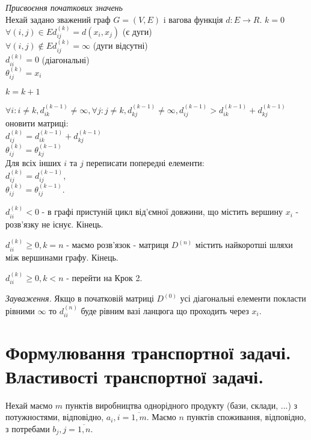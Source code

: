 \documentclass[12pt,a4paper]{report}
\newenvironment{slim_enumerate}{
\begin{enumerate}
  \setlength{\itemsep}{1pt}
  \setlength{\parskip}{0pt}
  \setlength{\parsep}{0pt}}
{\end{enumerate}}
\begin{document}
\begin{slim_enumerate}
  \item \emph{Присвоєння початкових значень}\\
Нехай задано зважений граф $G=(V,E)$ i вагова функція $d:E \rightarrow R$.
$k=0$\\
$\forall (i,j) \in E d_{ij}^{(k)}=d(x_i,x_j)$ (є дуги)\\
$\forall (i,j) \notin E d_{ij}^{(k)}=\infty$ (дуги відсутні)\\
$d_{ii}^{(k)}=0$ (діагональні)\\
$\theta_{ij}^{(k)}=x_i$
  \item $k=k+1$
  \item $\forall i: i \neq k, d_{ik}^{(k-1)} \neq \infty, \forall j: j \neq k, d_{kj}^{(k-1)} \neq \infty, d_{ij}^{(k-1)}>d_{ik}^{(k-1)}+d_{kj}^{(k-1)}$ оновити матриці:\\
$d_{ij}^{(k)}=d_{ik}^{(k-1)}+d_{kj}^{(k-1)}$\\
$\theta_{ij}^{(k)}=\theta_{kj}^{(k-1)}$\\
Для всіх інших $i$ та $j$ переписати попередні елементи:\\
$d_{ij}^{(k)}=d_{ij}^{(k-1)}$,\\
$\theta_{ij}^{(k)}=\theta_{ij}^{(k-1)}$.
  \item 
    \begin{slim_enumerate}
      \item $d_{ii}^{(k)} < 0$ - в графі пристуній цикл від’ємної довжини, що містить вершину $x_i$ - розв’язку не існує. Кінець.
      \item $d_{ii}^{(k)} \geq 0, k=n$ - маємо розв’язок - матриця $D^{(n)}$ містить найкоротші шляхи між вершинами графу. Кінець.
      \item $d_{ii}^{(k)} \geq 0, k<n$ - перейти на Крок 2.
    \end{slim_enumerate}
\end{slim_enumerate}

\emph{Зауваження.} Якщо в початковій матриці $D^{(0)}$ усі діагональні елементи покласти рівними $\infty$ то $d_{ii}^{(n)}$ буде рівним вазі ланцюга що проходить через $x_i$.

\clearpage

\chapter{Формулювання транспортної задачі. Властивості транспортної задачі.}

Нехай маємо $m$ пунктів виробництва однорідного продукту (бази, склади, ...) з потужностями, відповідно, $a_i, i = \overline{1, m}$. Маємо $n$ пунктів споживання, відповідно, з потребами $b_j, j =\overline{1, n}$.
\end{document}
